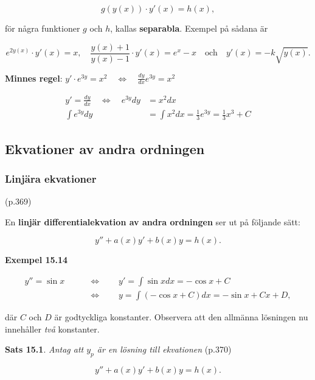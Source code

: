 \documentclass[11pt]{article}
\begin{document}
\begin{equation}
    g(y(x)) \cdot y'(x) = h(x),
\end{equation}

för några funktioner $g$ och $h$, kallas \textbf{separabla}. Exempel på sådana är

\begin{equation}
    e^{2y(x)} \cdot y'(x) = x, \quad \frac{y(x) + 1}{y(x) - 1} \cdot y'(x) = e^x - x \quad \text{och} \quad y'(x) = -k\sqrt{y(x)}.
\end{equation}

\textbf{Minnes regel}: $y' \cdot e^{3y} = x^2 \quad \Leftrightarrow \quad \frac{dy}{dx}e^{3y} = x^2$

\begin{align}
    y' = \frac{dy}{dx} \quad \Leftrightarrow \quad e^{3y}dy &= x^2 dx\\
    \int e^{3y}dy &= \int x^2 dx = \frac{1}{3} e^{3y} = \frac{1}{3} x^3 + C
\end{align}

\subsection{Ekvationer av andra ordningen}

\subsubsection{Linjära ekvationer} (p.369)

En \textbf{linjär differentialekvation av andra ordningen} ser ut på följande sätt:

\begin{equation}
    y'' + a(x)y' + b(x)y = h(x).
\end{equation}

\textbf{Exempel 15.14}

\begin{align}
    y'' = \sin x \qquad &\Leftrightarrow \qquad  y' = \int \sin x dx = -\cos x + C\\
                 \qquad &\Leftrightarrow \qquad y = \int (-\cos x + C) dx = -\sin x + Cx + D,
\end{align}

där $C$ och $D$ är godtyckliga konstanter. Observera att den allmänna lösningen nu innehåller \textit{två} konstanter.

\textbf{Sats 15.1}. \textit{Antag att $y_p$ är en lösning till ekvationen} (p.370)

\begin{equation}
    y'' + a(x)y' + b(x)y = h(x).
    \label{eq:diff_2ord_sats}
\end{equation}
\end{document}

